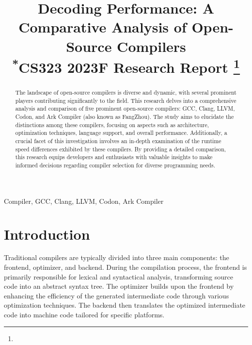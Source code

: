 \documentclass[conference]{IEEEtran}
\begin{document}
\title{Decoding Performance: A Comparative Analysis of Open-Source Compilers\\
{\footnotesize \textsuperscript{*}CS323 2023F Research Report}
\thanks{}
}

\author{
\and
{}
\and
{}
}
\maketitle

\begin{abstract}
The landscape of open-source compilers is diverse and dynamic, with several prominent players contributing significantly to the field. This research delves into a comprehensive analysis and comparison of five prominent open-source compilers: GCC, Clang, LLVM, Codon, and Ark Compiler (also known as FangZhou). The study aims to elucidate the distinctions among these compilers, focusing on aspects such as architecture, optimization techniques, language support, and overall performance. Additionally, a crucial facet of this investigation involves an in-depth examination of the runtime speed differences exhibited by these compilers. By providing a detailed comparison, this research equips developers and enthusiasts with valuable insights to make informed decisions regarding compiler selection for diverse programming needs.
\end{abstract}

\begin{IEEEkeywords}
Compiler, GCC, Clang, LLVM, Codon, Ark Compiler
\end{IEEEkeywords}

\section{Introduction}
Traditional compilers are typically divided into three main components: the frontend, optimizer, and backend. During the compilation process, the frontend is primarily responsible for lexical and syntactical analysis, transforming source code into an abstract syntax tree. The optimizer builds upon the frontend by enhancing the efficiency of the generated intermediate code through various optimization techniques. The backend then translates the optimized intermediate code into machine code tailored for specific platforms.
\end{document}
